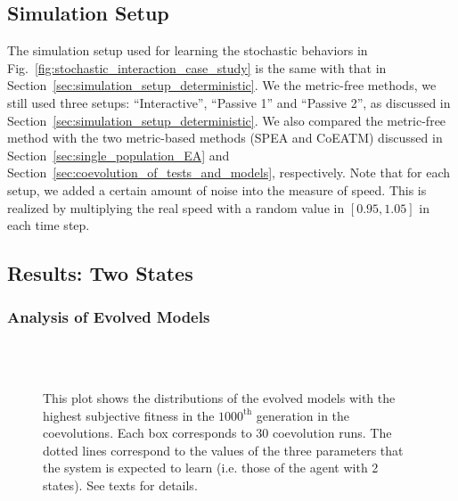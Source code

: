 \subsection{Simulation Setup}\label{sec:simulation_setup_stochastic_interaction}

The simulation setup used for learning the stochastic behaviors in Fig.~\ref{fig:stochastic_interaction_case_study} is the same with that in Section~\ref{sec:simulation_setup_deterministic}. We the metric-free methods, we still used three setups: ``Interactive'', ``Passive 1'' and ``Passive 2'', as discussed in Section~\ref{sec:simulation_setup_deterministic}. We also compared the metric-free method with the two metric-based methods (SPEA and CoEATM) discussed in Section~\ref{sec:single_population_EA} and Section~\ref{sec:coevolution_of_tests_and_models}, respectively. Note that for each setup, we added a certain amount of noise into the measure of speed. This is realized by multiplying the real speed with a random value in $[0.95, 1.05]$ in each time step. 

\subsection{Results: Two States}\label{sec:results_interaction_stochastic_2states}

\subsubsection{Analysis of Evolved Models}
\begin{figure}[!t]%
	\centering
		\\
		\\
		\caption{This plot shows the distributions of the evolved models with the highest subjective fitness in the $1000^\textrm{th}$ generation in the coevolutions. Each box corresponds to $30$ coevolution runs. The dotted lines correspond to the values of the three parameters that the system is expected to learn (i.e. those of the agent with 2 states). See texts for details.\label{fig:parameters_box_stochastic_two states}}
\end{figure}

